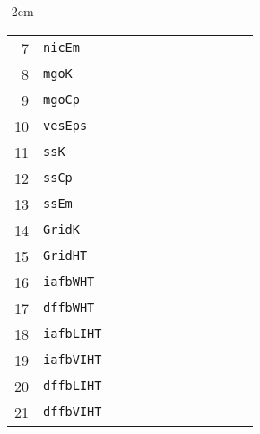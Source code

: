 \begin{table*}[!htbp]
\begin{adjustwidth*}{}{-2cm}
\begin{tabular}{@{}rlrrrrrrrrrc@{}}
\footnotesize{7}   & \footnotesize{\texttt{nicEm}}      &          &          &          &          &     &     & &          &     &     \\
\footnotesize{8}   & \footnotesize{\texttt{mgoK}}       &          &          &          &          &     &     & &          &     &     \\
\footnotesize{9}   & \footnotesize{\texttt{mgoCp}}      &          &          &          &          &     &     & &          &     &     \\
\footnotesize{10}  & \footnotesize{\texttt{vesEps}}     &          &          &          &          &     &     & &          &     &     \\
\footnotesize{11}  & \footnotesize{\texttt{ssK}}        &          &          &          &          &     &     & &          &     &     \\
\footnotesize{12}  & \footnotesize{\texttt{ssCp}}       &          &          &          &          &     &     & &          &     &     \\
\footnotesize{13}  & \footnotesize{\texttt{ssEm}}       &          &          &          &          &     &     & &          &     &     \\
\footnotesize{14}  & \footnotesize{\texttt{GridK}}      &          &          &          &          &     &     & &          &     &     \\
\footnotesize{15}  & \footnotesize{\texttt{GridHT}}     &          &          &          &          &     &     & &          &     &      \\
\footnotesize{16}  & \footnotesize{\texttt{iafbWHT}}    &          &          &          &          &     &     & &          &     &     \\
\footnotesize{17}  & \footnotesize{\texttt{dffbWHT}}    &          &          &          &          &     &     & &          &     &     \\
\footnotesize{18}  & \footnotesize{\texttt{iafbLIHT}}   &          &          &          &          &     &     & &          &     &     \\
\footnotesize{19}  & \footnotesize{\texttt{iafbVIHT}}   &          &          &          &          &     &     & &          &     &     \\
\footnotesize{20}  & \footnotesize{\texttt{dffbLIHT}}   &          &          &          &          &     &     & &          &     &     \\
\footnotesize{21}  & \footnotesize{\texttt{dffbVIHT}}   &          &          &          &          &     &     & &          &     &     \\

\end{tabular}
\end{adjustwidth*}
\end{table*}
